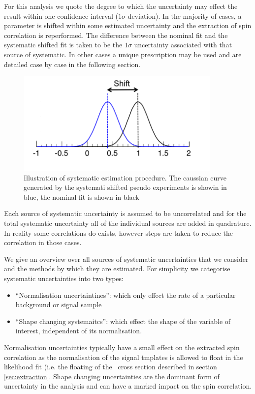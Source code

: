 For this analysis we quote the degree to which the uncertainty may effect the result within onc confidence interval ($1\sigma$ deviation). In the majority of cases, a parameter is shifted within some estimated uncertainty and the extraction of spin correlation is reperformed. The difference between the nominal fit and the systematic shifted fit is taken to be the $1\sigma$ uncertainty associated with that source of systematic. In other cases a unique prescription may be used and are detailed case by case in the following section.

\begin{figure}[htbp]
\begin{center}
\includegraphics[width=100mm]{f/GaussianFigure}
\end{center}
\caption{Illustration of systematic estimation procedure. The caussian curve generated by the systemati shifted pseudo experiments is showin in blue, the nominal fit is shown in black}
\label{fig:syst_gaussian}
\end{figure}

Each source of systematic uncertainty is assumed to be uncorrelated and for the total systematic uncertainty all of the individual sources are added in quadrature. In reality some correlations do exists, however steps are taken to reduce the correlation in those cases. 

We give an overview over all sources of systematic uncertainties that we consider and the methods by which they are estimated. For simplicity we categorise systematic uncertainties into two types: 
\begin{itemize}
	\item ``Normalisation uncertaintines'': which only effect the rate of a particular background or signal sample 
	\item ``Shape changing systemaitcs'': which effect the shape of the variable of interest, independent of its normalisation. 
\end{itemize}
Normalisation uncertainties typically have a small effect on the extracted spin correlation as the normalisation of the signal tmplates is allowed to float in the likelihood fit (i.e. the floating of the \ttbar\ cross section described in section \ref{sec:extraction}. Shape changing uncertainties are the dominant form of uncertainty in the analysis and can have a marked impact on the spin correlation.

